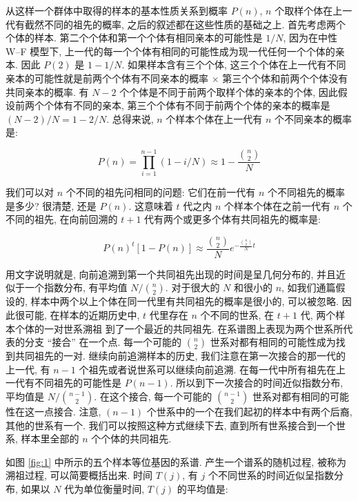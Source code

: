 \documentclass[
    12pt,%
    ]{article}
\begin{document}
从这样一个群体中取得的样本的基本性质关系到概率 $P(n)$, $n$ 个取样个体在上一代有截然不同的祖先的概率,
之后的叙述都在这些性质的基础之上. 首先考虑两个个体的样本. 第二个个体和第一个个体有相同亲本的可能性是 $1/N$, 因为在中性
W--F 模型下, 上一代的每一个个体有相同的可能性成为现一代任何一个个体的亲本. 因此 $P(2)$ 是 $1-1/N$.
如果样本含有三个个体, 这三个个体在上一代有不同亲本的可能性就是前两个个体有不同亲本的概率 $\times$
第三个个体和前两个个体没有共同亲本的概率. 有 $N-2$ 个个体是不同于前两个取样个体的亲本的个体,
因此假设前两个个体有不同的亲本, 第三个个体有不同于前两个个体的亲本的概率是 $(N-2)/N=1-2/N$. 总得来说, $n$
个样本个体在上一代有 $n$ 个不同亲本的概率是:

\begin{equation} \label{eq:3}
    P(n) = \prod_{i=1}^{n-1}(1-i/N) \approx 1-\frac{\binom{n}{2}}{N}
\end{equation}

我们可以对 $n$ 个不同的祖先问相同的问题: 它们在前一代有 $n$ 个不同祖先的概率是多少? 很清楚, 还是 $P(n)$. 这意味着 $t$
代之内 $n$ 个样本个体在之前一代有 $n$ 个不同的祖先, 在向前回溯的 $t+1$ 代有两个或更多个体有共同祖先的概率是:

\begin{equation} \label{eq:4}
    P(n)^{t}[1-P(n)] \approx \frac{\binom{n}{2}}{N} e^{-\frac{\binom{n}{2}}{N}t}
\end{equation}

用文字说明就是, 向前追溯到第一个共同祖先出现的时间是呈几何分布的, 并且近似于一个指数分布, 有平均值 $N/\binom{n}{2}$.
对于很大的 $N$ 和很小的 $n$, 如我们通篇假设的, 样本中两个以上个体在同一代里有共同祖先的概率是很小的, 可以被忽略.
因此很可能, 在样本的近期历史中, $t$ 代里存在 $n$ 个不同的世系, 在 $t+1$ 代, 两个样本个体的一对世系溯祖
到了一个最近的共同祖先. 在系谱图上表现为两个世系所代表的分支 ``接合'' 在一个点. 每一个可能的 $\binom{n}{2}$
世系对都有相同的可能性成为找到共同祖先的一对. 继续向前追溯样本的历史, 我们注意在第一次接合的那一代的上一代, 有 $n-1$
个祖先或者说世系可以继续向前追溯. 在每一代中所有祖先在上一代有不同祖先的可能性是 $P(n-1)$.
所以到下一次接合的时间近似指数分布, 平均值是 $N/\binom{n-1}{2}$. 在这个接合, 每一个可能的 $\binom{n-1}{2}$
世系对都有相同的可能性在这一点接合. 注意, $(n-1)$ 个世系中的一个在我们起初的样本中有两个后裔, 其他的世系有一个.
我们可以按照这种方式继续下去, 直到所有世系接合到一个世系, 样本里全部的 $n$ 个个体的共同祖先.

如图 \ref{fig:1} 中所示的五个样本等位基因的系谱. 产生一个谱系的随机过程, 被称为溯祖过程, 可以简要概括出来. 时间
$T(j)$, 有 $j$ 个不同世系的时间近似呈指数分布, 如果以 $N$ 代为单位衡量时间, $T(j)$ 的平均值是:
\end{document}
